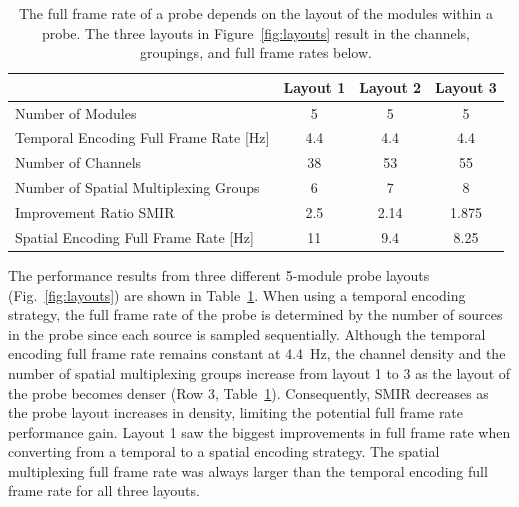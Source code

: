     \begin{table}%
        \centering
        \caption{The full frame rate of a probe depends on the layout of the modules within a probe. The three layouts in Figure~\ref{fig:layouts} result in the channels, groupings, and full frame rates below.}
        \label{tab:layouts}
        \begin{tabular}{lccc}
        \hline
        \multicolumn{1}{r}{}                       & Layout 1 & Layout 2 & Layout 3 \\ \hline
        Number of Modules                          & 5        & 5        & 5        \\
        Temporal Encoding Full Frame Rate {[}Hz{]} & 4.4      & 4.4      & 4.4      \\
        Number of Channels                         & 38       & 53       & 55       \\
        Number of Spatial Multiplexing Groups      & 6        & 7        & 8        \\
        Improvement Ratio \ac{SMIR}                & 2.5      & 2.14     & 1.875    \\
        Spatial Encoding Full Frame Rate {[}Hz{]}  & 11       & 9.4      & 8.25     \\ \hline
        \end{tabular}
    \end{table}
The performance results from three different 5-module probe layouts (Fig.~\ref{fig:layouts}) are shown in Table~\ref{tab:layouts}. When using a temporal encoding strategy, the full frame rate of the probe is determined by the number of sources in the probe since each source is sampled sequentially. Although the temporal encoding full frame rate remains constant at 4.4~Hz, the channel density and the number of spatial multiplexing groups increase from layout 1 to 3 as the layout of the probe becomes denser (Row 3, Table~\ref{tab:layouts}). Consequently, \ac{SMIR} decreases as the probe layout increases in density, limiting the potential full frame rate performance gain. Layout 1 saw the biggest improvements in full frame rate when converting from a temporal to a spatial encoding strategy. The spatial multiplexing full frame rate was always larger than the temporal encoding full frame rate for all three layouts.  



